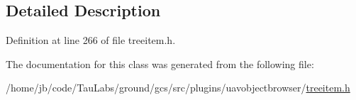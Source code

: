 \subsection{\-Detailed \-Description}


\-Definition at line 266 of file treeitem.\-h.



\-The documentation for this class was generated from the following file\-:\begin{DoxyCompactItemize}
\item 
/home/jb/code/\-Tau\-Labs/ground/gcs/src/plugins/uavobjectbrowser/\hyperlink{treeitem_8h}{treeitem.\-h}\end{DoxyCompactItemize}
